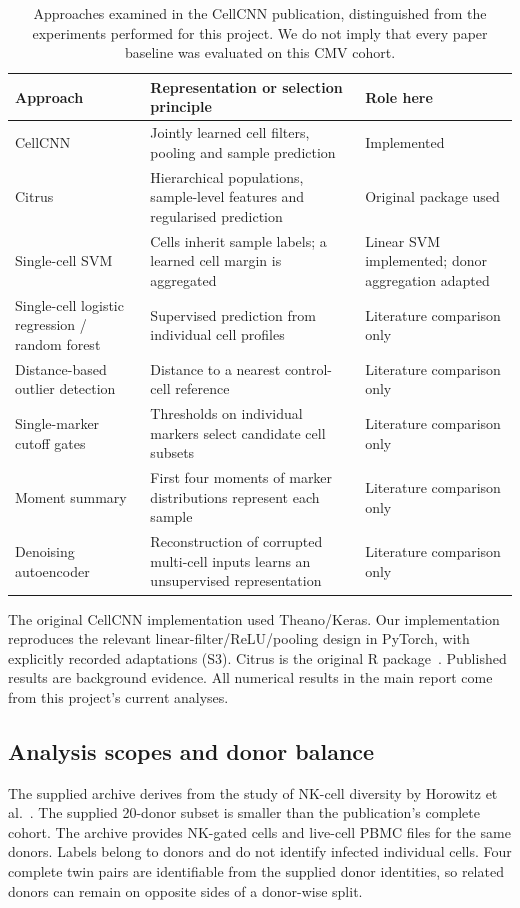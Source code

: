 \documentclass[11pt,a4paper]{article}
\begin{document}
\begin{table}[htb]\centering\small
\begin{tabular}{@{}>{\raggedright\arraybackslash}p{.22\linewidth}>{\raggedright\arraybackslash}p{.48\linewidth}>{\raggedright\arraybackslash}p{.24\linewidth}@{}}\toprule
Approach & Representation or selection principle & Role here\\\midrule
CellCNN & Jointly learned cell filters, pooling and sample prediction & Implemented\\
Citrus & Hierarchical populations, sample-level features and regularised prediction & Original package used\\
Single-cell SVM & Cells inherit sample labels; a learned cell margin is aggregated & Linear SVM implemented; donor aggregation adapted\\
Single-cell logistic regression / random forest & Supervised prediction from individual cell profiles & Literature comparison only\\
Distance-based outlier detection & Distance to a nearest control-cell reference & Literature comparison only\\
Single-marker cutoff gates & Thresholds on individual markers select candidate cell subsets & Literature comparison only\\
Moment summary & First four moments of marker distributions represent each sample & Literature comparison only\\
Denoising autoencoder & Reconstruction of corrupted multi-cell inputs learns an unsupervised representation & Literature comparison only\\\bottomrule
\end{tabular}
\caption{Approaches examined in the CellCNN publication, distinguished from the experiments performed for this project. We do not imply that every paper baseline was evaluated on this CMV cohort.}
\end{table}

The original CellCNN implementation used Theano/Keras. Our implementation reproduces the relevant linear-filter/ReLU/pooling design in PyTorch, with explicitly recorded adaptations (S3). Citrus is the original R package~\cite{citrus}. Published results are background evidence. All numerical results in the main report come from this project's current analyses.

\subsection{Analysis scopes and donor balance}
The supplied archive derives from the study of NK-cell diversity by Horowitz et al.~\cite{horowitz}. The supplied 20-donor subset is smaller than the publication's complete cohort. The archive provides NK-gated cells and live-cell PBMC files for the same donors. Labels belong to donors and do not identify infected individual cells. Four complete twin pairs are identifiable from the supplied donor identities, so related donors can remain on opposite sides of a donor-wise split.
\end{document}
